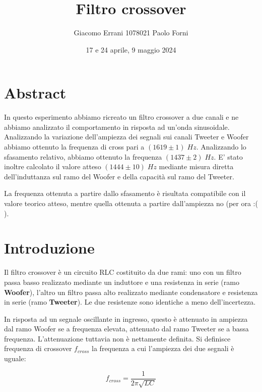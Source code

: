 \documentclass[12pt,a4paper]{article}
\title{Filtro crossover} %
\date{17 e 24 aprile, 9 maggio 2024}
\author{Giacomo Errani 1078021 Paolo Forni}
\begin{document}
\newcommand{\theoryF}{ $(1444 \pm 10) \; Hz $}
\newcommand{\amplitudeF}{$(1619 \pm 1) \; Hz $}
\newcommand{\phaseF}{$(1437 \pm 2) \; Hz $}

\maketitle

\section{Abstract}

\indent In questo esperimento abbiamo ricreato un filtro crossover a due canali e ne abbiamo analizzato il comportamento in risposta ad un'onda sinusoidale. Analizzando la variazione dell'ampiezza dei segnali sui canali Tweeter e Woofer abbiamo ottenuto la frequenza di cross pari a \amplitudeF. Analizzando lo sfasamento relativo, abbiamo ottenuto la frequenza \phaseF. E' stato inoltre calcolato il valore atteso \theoryF \hspace{1pt} mediante misura diretta dell'induttanza sul ramo del Woofer e della capacità sul ramo del Tweeter. 

La frequenza ottenuta a partire dallo sfasamento è risultata compatibile con il valore teorico atteso, mentre quella ottenuta a partire dall'ampiezza no (per ora :( ).

\section{Introduzione}
Il filtro crossover è un circuito RLC costituito da due rami: uno con un filtro passa basso realizzato mediante un induttore e una resistenza in serie (ramo \textbf{Woofer}), l'altro un filtro passa alto realizzato mediante condensatore e resistenza in serie (ramo \textbf{Tweeter}). Le due resistenze sono identiche a meno dell'incertezza.

In risposta ad un segnale oscillante in ingresso, questo è attenuato in ampiezza dal ramo Woofer se a frequenza elevata, attenuato dal ramo Tweeter se a bassa frequenza. L'attenuazione tuttavia non è nettamente definita. Si definisce frequenza di crossover $f_{cross}$ la frequenza a cui l'ampiezza dei due segnali è uguale:

\begin{equation}
\label{eqn:fcross}
f_{cross} = \frac{1}{2 \pi \sqrt{LC} }
\end{equation}
\end{document}
